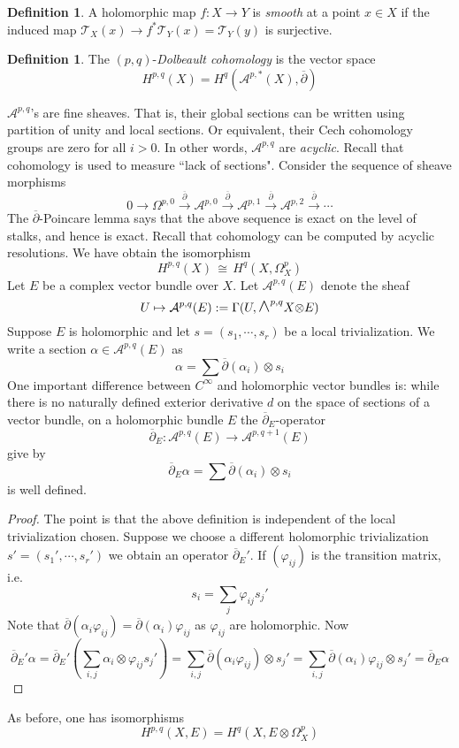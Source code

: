 \documentclass[12pt]{article}
\theoremstyle{plain}
\theoremstyle{definition}
\newtheorem{definition}[equation]{Definition}
\newcommand\iso{\,{\cong}\,}
\newcommand\tensor{{\otimes}}
\newcommand{\<}{\langle}
\renewcommand{\>}{\rangle}
\newcommand{\p}{\partial}
\newcommand{\Ohm}{\Omega}
\newcommand{\bp}{\overline{\p}}
\newcommand{\sT}{\mathcal{T}}
\newcommand{\sA}{\mathcal{A}}
\newcommand{\bwedge}{\mbox{\Large $\wedge$}}
\begin{document}
\begin{definition}
A holomorphic map $f : X \to Y$ is \textit{smooth} at a point $x \in X$ if the induced map $\sT_X(x) \to f^* \sT_Y(x) = \sT_Y(y)$ is surjective. 
\end{definition}
\begin{definition}
The $(p, q)$-\textit{Dolbeault cohomology} is the vector space 
$$ H^{p, q}(X) = H^q(\sA^{p, *}(X), \bp) $$
\end{definition}
$\sA^{p, q}$'s are fine sheaves. That is, their global sections can be written using partition of unity and local sections. Or equivalent, their Cech cohomology groups are zero for all $i > 0$. In other words, $\sA^{p, q}$ are \textit{acyclic}. Recall that cohomology is used to measure ``lack of sections". 
Consider the sequence of sheave morphisms
$$ 0 \to \Ohm^{p, 0} \stackrel{\bp}{\to} \sA^{p, 0} \stackrel{\bp}{\to} \sA^{p, 1} \stackrel{\bp}{\to} \sA^{p, 2} \stackrel{\bp}{\to} \cdots $$
The $\bp$-Poincare lemma says that the above sequence is exact on the level of stalks, and hence is exact. Recall that cohomology can be computed by acyclic resolutions. We have obtain the isomorphism
$$ H^{p, q}(X) \iso H^q(X, \Ohm_X^p) $$
Let $E$ be a complex vector bundle over $X$. Let $\sA^{p, q}(E)$ denote the sheaf
$$ U \mapsto \sA^{p, q}(E) : = \Gamma(U, \bwedge^{p, q} X \tensor E)$$
Suppose $E$ is holomorphic and let $s = (s_1, \cdots, s_r)$ be a local trivialization. We write a section $\alpha \in \sA^{p, q}(E)$ as 
$$ \alpha = \sum \bp(\alpha_i) \tensor s_i $$
One important difference between $C^\infty$ and holomorphic vector bundles is: while there is no naturally defined exterior derivative $d$ on the space of sections of a vector bundle, on a holomorphic bundle $E$ the $\bp_E$-operator 
$$ \bp_E : \sA^{p, q}(E) \to \sA^{p, q + 1}(E) $$ 
give by 
$$ \bp_E \alpha = \sum \bp(\alpha_i) \tensor s_i $$
is well defined. 
\begin{proof}
The point is that the above definition is independent of the local trivialization chosen. Suppose we choose a different holomorphic trivialization $s' = (s_1', \cdots, s_r')$ we obtain an operator $\bp_E'$. If $(\varphi_{ij})$ is the transition matrix, i.e. 
$$ s_i = \sum_{j} \varphi_{ij} s_j'$$
Note that $\bp(\alpha_i \varphi_{ij}) = \bp(\alpha_i) \varphi_{ij}$ as $\varphi_{ij}$ are holomorphic. Now 
$$ \bp_E' \alpha = \bp_E' (\sum_{i, j} \alpha_i \tensor \varphi_{ij} s_j') = \sum_{i, j} \bp(\alpha_i \varphi_{ij}) \tensor s_j' = \sum_{i, j} \bp(\alpha_i)\varphi_{ij} \tensor s_j' = \bp_E \alpha   $$
\end{proof}
As before, one has isomorphisms
$$ H^{p, q}(X, E)  = H^q(X, E \tensor \Ohm_X^p) $$
\end{document}
